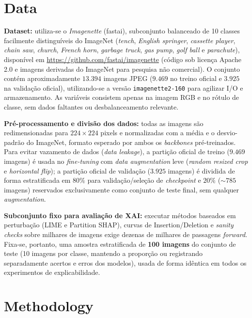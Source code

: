 \documentclass{article}
\begin{document}
\section{Data}
\label{sec:data}

\textbf{Dataset:} utiliza-se o \textit{Imagenette} (fastai), subconjunto balanceado de 10 classes facilmente distinguíveis do ImageNet (\textit{tench}, \textit{English springer}, \textit{cassette player}, \textit{chain saw}, \textit{church}, \textit{French horn}, \textit{garbage truck}, \textit{gas pump}, \textit{golf ball} e \textit{parachute}), disponível em \url{https://github.com/fastai/imagenette} (código sob licença Apache 2.0 e imagens derivadas do ImageNet para pesquisa não comercial). O conjunto contém aproximadamente $13.394$ imagens JPEG ($9.469$ no treino oficial e $3.925$ na validação oficial), utilizando-se a versão \texttt{imagenette2-160} para agilizar I/O e armazenamento. As variáveis consistem apenas na imagem RGB e no rótulo de classe, sem dados faltantes ou desbalanceamento relevante.

\textbf{Pré-processamento e divisão dos dados:} todas as imagens são redimensionadas para $224 \times 224$ pixels e normalizadas com a média e o desvio-padrão do ImageNet, formato esperado por ambos os \textit{backbones} pré-treinados. Para evitar vazamento de dados (\textit{data leakage}), a partição oficial de treino ($9.469$ imagens) é usada no \textit{fine-tuning} com \textit{data augmentation} leve (\textit{random resized crop} e \textit{horizontal flip}); a partição oficial de validação ($3.925$ imagens) é dividida de forma estratificada em $80\%$ para validação/seleção de \textit{checkpoint} e $20\%$ ($\sim 785$ imagens) reservados exclusivamente como conjunto de teste final, sem qualquer \textit{augmentation}.

\textbf{Subconjunto fixo para avaliação de XAI:} executar métodos baseados em perturbação (LIME e Partition SHAP), curvas de Insertion/Deletion e \textit{sanity checks} sobre milhares de imagens exige dezenas de milhares de passagens \textit{forward}. Fixa-se, portanto, uma amostra estratificada de \textbf{100 imagens} do conjunto de teste (10 imagens por classe, mantendo a proporção ou registrando separadamente acertos e erros dos modelos), usada de forma idêntica em todos os experimentos de explicabilidade.

\section{Methodology}
\label{sec:method}
\end{document}
